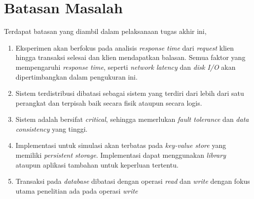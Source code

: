 \section{Batasan Masalah}

Terdapat batasan yang diambil dalam pelaksanaan tugas akhir ini,

\begin{enumerate}
    \item Eksperimen akan berfokus pada analisis \textit{response time} dari \textit{request} klien hingga transaksi selesai dan klien mendapatkan balasan. Semua faktor yang mempengaruhi \textit{response time}, seperti \textit{network latency} dan \textit{disk I/O} akan dipertimbangkan dalam pengukuran ini.
    \item Sistem terdistribusi dibatasi sebagai sistem yang terdiri dari lebih dari satu perangkat dan terpisah baik secara fisik ataupun secara logis.
    \item Sistem adalah bersifat \textit{critical}, sehingga memerlukan \textit{fault tolerance} dan \textit{data consistency} yang tinggi.
    \item Implementasi untuk simulasi akan terbatas pada \textit{key-value store} yang memiliki \textit{persistent storage}. Implementasi dapat menggunakan \textit{library} ataupun aplikasi tambahan untuk keperluan tertentu.
    \item Transaksi pada \textit{database} dibatasi dengan operasi \textit{read} dan \textit{write} dengan fokus utama penelitian ada pada operasi \textit{write} 
\end{enumerate}

